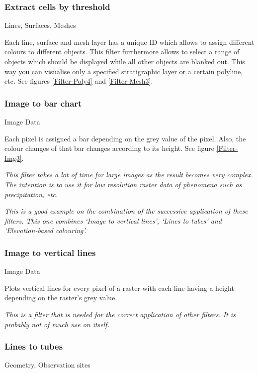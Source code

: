\subsubsection{Extract cells by threshold}
 Lines, Surfaces, Meshes

 Each line, surface and mesh layer has a unique ID which allows to assign different colours to different objects. This filter furthermore allows to select a range of objects which should be displayed while all other objects are blanked out. This way you can visualise only a specified stratigraphic layer or a certain polyline, etc. See figures \ref{Filter-Poly4} and \ref{Filter-Mesh3}.

\subsubsection{Image to bar chart}
 Image Data

 Each pixel is assigned a bar depending on the grey value of the pixel. Also, the colour changes of that bar changes according to its height. See figure \ref{Filter-Img3}.

 \emph{This filter takes a lot of time for large images as the result becomes very complex. The intention is to use it for low resolution raster data of phenomena such as precipitation, etc.}

\emph{This is a good example on the combination of the successive application of these filters. This one combines `Image to vertical lines', `Lines to tubes' and `Elevation-based colouring'.}

\subsubsection{Image to vertical lines}
 Image Data

 Plots vertical lines for every pixel of a raster with each line having a height depending on the raster's grey value.

 \emph{This is a filter that is needed for the correct application of other filters. It is probably not of much use on itself.}

\subsubsection{Lines to tubes}
 Geometry, Observation sites

